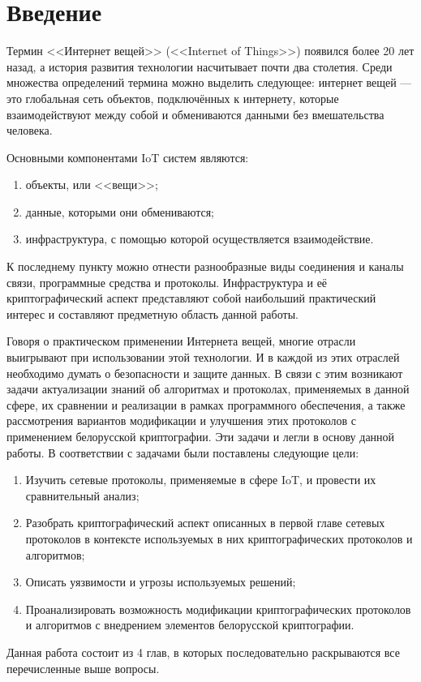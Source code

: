 \chapter*{Введение}
 
 	Термин <<Интернет вещей>> (<<Internet of Things>>) появился более 20 лет назад, а история развития
 	технологии насчитывает почти два столетия. Среди множества определений термина можно выделить
 	следующее: интернет вещей --- это глобальная сеть объектов, подключённых к интернету, которые 
 	взаимодействуют между собой и обмениваются данными без вмешательства человека.
 	
 	Основными компонентами IoT систем являются:
 	\begin{enumerate}
 		\item объекты, или <<вещи>>;
 		\item данные, которыми они обмениваются;
 		\item инфраструктура, с помощью которой осуществляется взаимодействие.
 	\end{enumerate}
 	К последнему пункту можно отнести разнообразные виды соединения и каналы связи, программные 
 	средства и протоколы. Инфраструктура и её криптографический аспект представляют собой наибольший
 	практический интерес и составляют предметную область данной работы.
 	
 	Говоря о практическом применении Интернета вещей, многие отрасли выигрывают при использовании
 	этой технологии. И в каждой из этих отраслей необходимо думать о безопасности и защите данных.
 	В связи с этим возникают задачи актуализации знаний об алгоритмах и протоколах, применяемых в
 	данной сфере, их сравнении и реализации в рамках программного обеспечения, а также рассмотрения
 	вариантов модификации и улучшения этих протоколов с применением белорусской криптографии. Эти
 	задачи и легли в основу данной работы. В соответствии с задачами были поставлены следующие цели:
 	
 	\begin{enumerate}
 		\item Изучить сетевые протоколы, применяемые в сфере IoT, и провести их сравнительный анализ;
 		\item Разобрать криптографический аспект описанных в первой главе сетевых протоколов в контексте
 		используемых в них криптографических протоколов и алгоритмов;
 		\item Описать уязвимости и угрозы используемых решений;
 		\item Проанализировать возможность модификации криптографических протоколов и алгоритмов с
 		внедрением элементов белорусской криптографии.
 	\end{enumerate}
 	
 	Данная работа состоит из 4 глав, в которых последовательно раскрываются все перечисленные выше
 	вопросы.